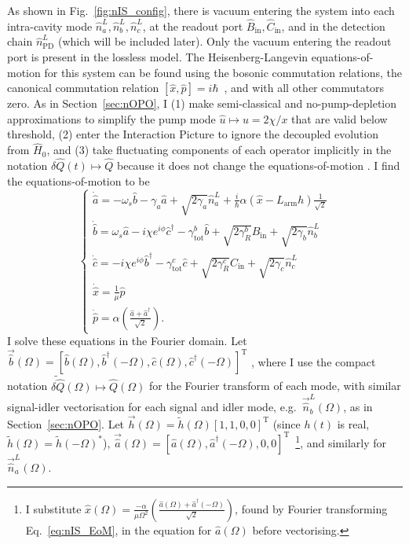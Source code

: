 As shown in Fig.~\ref{fig:nIS_config}, there is vacuum entering the system into each intra-cavity mode $\hat n^L_a, \hat n^L_b, \hat n^L_c$, at the readout port $\hat B_\text{in}, \hat C_\text{in}$, and in the detection chain $\hat n^L_\text{PD}$ (which will be included later). Only the vacuum entering the readout port is present in the lossless model.
The Heisenberg-Langevin equations-of-motion for this system can be found using the bosonic commutation relations, the canonical commutation relation $[\hat x,\hat p]=i\hbar$~\cite{}, and with all other commutators zero. As in Section~\ref{sec:nOPO}, I (1) make semi-classical and no-pump-depletion approximations to simplify the pump mode $\hat u\mapsto u=2\chi/x$ that are valid below threshold, (2) enter the Interaction Picture to ignore the decoupled evolution from $\hat H_0$, and (3) take fluctuating components of each operator implicitly in the notation $\delta\hat{Q}(t)\mapsto\hat{Q}$ because it does not change the equations-of-motion . I find the equations-of-motion to be 
\begin{equation}\label{eq:nIS_EoM}
\begin{cases}
\dot{\hat{a}}=-\omega_s\hat{b} - \gamma_a \hat{a} + \sqrt{2\gamma_a}\hat{n}^L_a+\frac{i}{\hbar}\alpha(\hat{x}-L_\mathrm{arm}h)\frac{1}{\sqrt{2}}\\
\dot{\hat{b}}=\omega_s\hat{a} - i\chi e^{i\phi}\hat{c}^\dagger - \gamma^b_\mathrm{tot} \hat{b} + \sqrt{2\gamma^b_R}\hat{B}_\mathrm{in} + \sqrt{2\gamma_b}\hat{n}^L_b\\
\dot{\hat{c}}=-i\chi e^{i\phi}\hat{b}^\dagger - \gamma^c_\mathrm{tot} \hat{c} + \sqrt{2\gamma^c_R}\hat{C}_\mathrm{in} + \sqrt{2\gamma_c}\hat{n}^L_c\\
\dot{\hat{x}}=\frac{1}{\mu}\hat{p}\\
\dot{\hat{p}}=\alpha\left(\frac{\hat{a}+\hat{a}^\dag}{\sqrt{2}}\right).
\end{cases}
\end{equation}
I solve these equations in the Fourier domain. Let $\vec{\hat b}(\Omega)=[\hat b(\Omega), \hat b^\dag(-\Omega), \hat c(\Omega), \hat c^\dag(-\Omega)]^\text{T}$ , where I use the compact notation $\tilde{\delta\hat{Q}}(\Omega)\mapsto\hat{Q}(\Omega)$ for the Fourier transform of each mode, with similar signal-idler vectorisation for each signal and idler mode, e.g.\ $\vec{\hat n}^L_b(\Omega)$, as in Section~\ref{sec:nOPO}. Let $\vec h(\Omega)=\tilde h(\Omega) [1,1,0,0]^\text{T}$ (since $h(t)$ is real, $\tilde h(\Omega)=\tilde h(-\Omega)^*$), $\vec{\hat a}(\Omega)=[\hat a(\Omega), \hat a^\dag(-\Omega),0,0]^\text{T}$~\footnote{I substitute $\hat x(\Omega) = \frac{-\alpha}{\mu\Omega^2}\left(\frac{\hat{a}(\Omega)+\hat{a}^\dag(-\Omega)}{\sqrt{2}}\right)$, found by Fourier transforming Eq.~\ref{eq:nIS_EoM}, in the equation for $\hat a(\Omega)$ before vectorising.}, and similarly for $\vec{\hat n}^L_a(\Omega)$.

